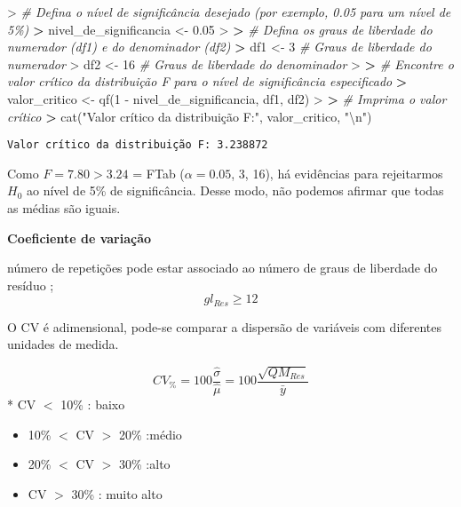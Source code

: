 \documentclass[
]{book}
\newenvironment{Shaded}{\begin{snugshade}}{\end{snugshade}}
\newcommand{\CommentTok}[1]{\textcolor[rgb]{0.56,0.35,0.01}{\textit{#1}}}
\newcommand{\DecValTok}[1]{\textcolor[rgb]{0.00,0.00,0.81}{#1}}
\newcommand{\ErrorTok}[1]{\textcolor[rgb]{0.64,0.00,0.00}{\textbf{#1}}}
\newcommand{\FloatTok}[1]{\textcolor[rgb]{0.00,0.00,0.81}{#1}}
\newcommand{\FunctionTok}[1]{\textcolor[rgb]{0.00,0.00,0.00}{#1}}
\newcommand{\NormalTok}[1]{#1}
\newcommand{\OtherTok}[1]{\textcolor[rgb]{0.56,0.35,0.01}{#1}}
\newcommand{\SpecialCharTok}[1]{\textcolor[rgb]{0.00,0.00,0.00}{#1}}
\newcommand{\StringTok}[1]{\textcolor[rgb]{0.31,0.60,0.02}{#1}}
\begin{document}
\begin{Shaded}
\begin{Highlighting}[]
\SpecialCharTok{\textgreater{}} \CommentTok{\# Defina o nível de significância desejado (por exemplo, 0.05 para um nível de 5\%)}
\ErrorTok{\textgreater{}}\NormalTok{ nivel\_de\_significancia }\OtherTok{\textless{}{-}} \FloatTok{0.05}
\SpecialCharTok{\textgreater{}} 
\ErrorTok{\textgreater{}} \CommentTok{\# Defina os graus de liberdade do numerador (df1) e do denominador (df2)}
\ErrorTok{\textgreater{}}\NormalTok{ df1 }\OtherTok{\textless{}{-}} \DecValTok{3}  \CommentTok{\# Graus de liberdade do numerador}
\SpecialCharTok{\textgreater{}}\NormalTok{ df2 }\OtherTok{\textless{}{-}} \DecValTok{16} \CommentTok{\# Graus de liberdade do denominador}
\SpecialCharTok{\textgreater{}} 
\ErrorTok{\textgreater{}} \CommentTok{\# Encontre o valor crítico da distribuição F para o nível de significância especificado}
\ErrorTok{\textgreater{}}\NormalTok{ valor\_critico }\OtherTok{\textless{}{-}} \FunctionTok{qf}\NormalTok{(}\DecValTok{1} \SpecialCharTok{{-}}\NormalTok{ nivel\_de\_significancia, df1, df2)}
\SpecialCharTok{\textgreater{}} 
\ErrorTok{\textgreater{}} \CommentTok{\# Imprima o valor crítico}
\ErrorTok{\textgreater{}} \FunctionTok{cat}\NormalTok{(}\StringTok{"Valor crítico da distribuição F:"}\NormalTok{, valor\_critico, }\StringTok{"}\SpecialCharTok{\textbackslash{}n}\StringTok{"}\NormalTok{)}
\end{Highlighting}
\end{Shaded}

\begin{verbatim}
Valor crítico da distribuição F: 3.238872 
\end{verbatim}

Como \(F = 7. 80 > 3. 24\) = FTab (\(\alpha = 0. 05\), 3, 16), há evidências para rejeitarmos \(H_0\) ao nível de 5\% de significância. Desse modo, não podemos afirmar que todas as médias são iguais.

\textbf{Coeficiente de variação}

número de repetições pode estar associado ao número de graus de liberdade do resíduo ; \[gl_{Res} \geq 12\]

O CV é adimensional, pode-se comparar a dispersão de variáveis
com diferentes unidades de medida.

\[\displaystyle{CV_{\%} = 100\frac{\hat{\sigma}}{\hat{\mu}} = 100\frac{\sqrt{QM_{Res}}}{\bar{y}}}\]
* CV \(<\) 10\% : baixo

\begin{itemize}
\item
  10\% \(<\) CV \(>\) 20\% :médio
\item
  20\% \(<\) CV \(>\) 30\% :alto
\item
  CV \(>\) 30\% : muito alto
\end{itemize}
\end{document}

